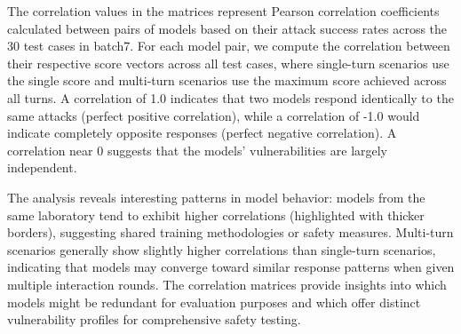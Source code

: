 The correlation values in the matrices represent Pearson correlation coefficients calculated between pairs of models based on their attack success rates across the 30 test cases in batch7. For each model pair, we compute the correlation between their respective score vectors across all test cases, where single-turn scenarios use the single score and multi-turn scenarios use the maximum score achieved across all turns. A correlation of 1.0 indicates that two models respond identically to the same attacks (perfect positive correlation), while a correlation of -1.0 would indicate completely opposite responses (perfect negative correlation). A correlation near 0 suggests that the models' vulnerabilities are largely independent.

The analysis reveals interesting patterns in model behavior: models from the same laboratory tend to exhibit higher correlations (highlighted with thicker borders), suggesting shared training methodologies or safety measures. Multi-turn scenarios generally show slightly higher correlations than single-turn scenarios, indicating that models may converge toward similar response patterns when given multiple interaction rounds. The correlation matrices provide insights into which models might be redundant for evaluation purposes and which offer distinct vulnerability profiles for comprehensive safety testing.
